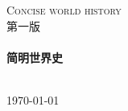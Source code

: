\begin{titlepage}

\begin{center}



\textsc{\LARGE Concise world history}\\[1.5cm]

\textsc{\Large 第一版}\\[0.5cm]


\HRule \\[0.4cm]
{ \huge \bfseries 简明世界史}\\[0.4cm]

\HRule \\[1.5cm]




\vfill

{\large \today}

\end{center}

\end{titlepage}

